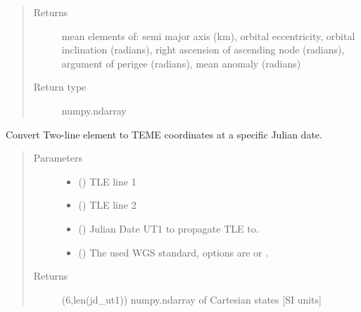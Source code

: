 \documentclass[letterpaper,10pt,english]{sphinxmanual}
\begin{document}
\begin{fulllineitems}
\begin{quote}
\begin{description}
\begin{itemize}
\end{itemize}

\item[{Returns}] \leavevmode
mean elements of: semi major axis (km), orbital eccentricity, orbital inclination (radians), right ascension of ascending node (radians), argument of perigee (radians), mean anomaly (radians)

\item[{Return type}] \leavevmode
numpy.ndarray

\end{description}\end{quote}

\end{fulllineitems}


\begin{fulllineitems}
\label{\detokenize{modules/TLE_tools:TLE_tools.TLE_propagation_TEME}}
Convert Two-line element to TEME coordinates at a specific Julian date.
\begin{quote}\begin{description}
\item[{Parameters}] \leavevmode\begin{itemize}
\item {} 
 () \textendash{} TLE line 1

\item {} 
 () \textendash{} TLE line 2

\item {} 
 () \textendash{} Julian Date UT1 to propagate TLE to.

\item {} 
 () \textendash{} The used WGS standard, options are  or .

\end{itemize}

\item[{Returns}] \leavevmode
(6,len(jd\_ut1)) numpy.ndarray of Cartesian states {[}SI units{]}

\end{description}\end{quote}

\end{fulllineitems}
\end{document}
